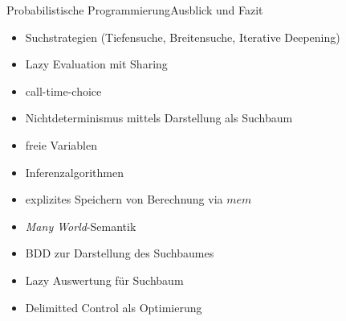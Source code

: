 \documentclass{beamer}
\begin{document}
\begin{frame}{Probabilistische Programmierung}{Ausblick und Fazit}

\begin{minipage}{.48\textwidth}
\begin{itemize}
\item Suchstrategien (Tiefensuche, Breitensuche, Iterative Deepening)
\item Lazy Evaluation mit Sharing
\item call-time-choice
\item Nichtdeterminismus mittels Darstellung als Suchbaum
\item freie Variablen
\end{itemize}
\end{minipage}
%
\hfill
%
\begin{minipage}{.48\textwidth}
\begin{itemize}
\item Inferenzalgorithmen
\item explizites Speichern von Berechnung via $mem$
\item \emph{Many World}-Semantik
\item BDD zur Darstellung des Suchbaumes
\item Lazy Auswertung f\"ur Suchbaum
\item Delimitted Control als Optimierung
\end{itemize}
\end{minipage}


\end{frame}
\end{document}

